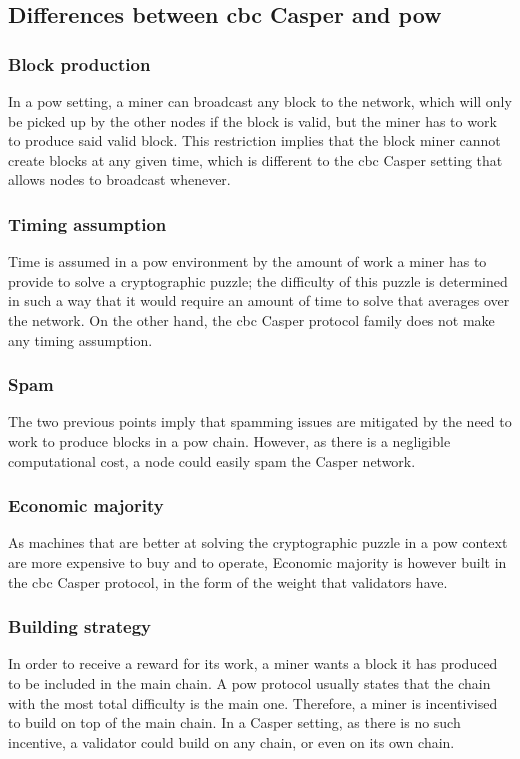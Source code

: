 \FloatBarrier
\subsection{Differences between \gls{cbc} Casper and \gls{pow}}
\label{ssec:powVsPos}
\subsubsection{Block production}
In a \gls{pow}\cite{yellowpaper} setting, a miner can broadcast any block to the
network, which will only be picked up by the other nodes if the block is valid,
but the miner has to work to produce said valid block. This restriction implies
that the block miner cannot create blocks at any given time, which is different
to the \gls{cbc} Casper setting that allows nodes to broadcast whenever. 

\subsubsection{Timing assumption}
Time is assumed in a \gls{pow} environment by the amount of work a miner has to
provide to solve a cryptographic puzzle; the difficulty of this puzzle is
determined in such a way that it would require an amount of time to solve that
averages over the network. On the other hand, the \gls{cbc} Casper protocol
family does not make any timing assumption.

\subsubsection{Spam}
The two previous points imply that spamming issues are mitigated by the need to
work to produce blocks in a \gls{pow} chain. However, as there is a negligible
computational cost, a node could easily spam the Casper network.

\subsubsection{Economic majority}
As machines that are better at solving the cryptographic puzzle in a \gls{pow}
context are more expensive to buy and to operate, 
Economic majority is however built in the \gls{cbc} Casper protocol, in the form
of the weight that validators have.

\subsubsection{Building strategy}
In order to receive a reward for its work, a miner wants a block it has produced
to be included in the main chain. A \gls{pow} protocol usually states that the
chain with the most total difficulty is the main one. Therefore, a miner is
incentivised to build on top of the main chain. 
In a Casper setting, as there is no such incentive, a validator could build on
any chain, or even on its own chain.


